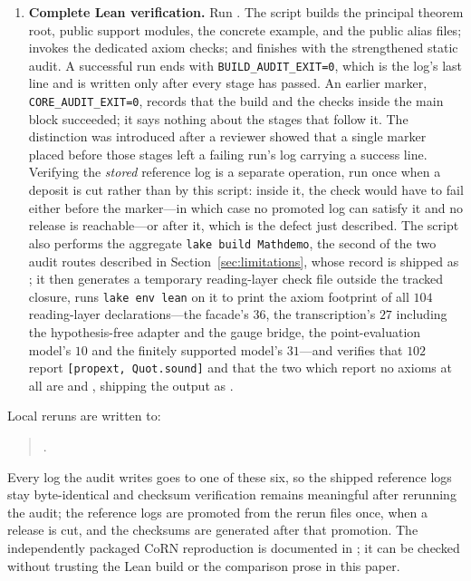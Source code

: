 \documentclass[11pt]{article}
\theoremstyle{definition}
\theoremstyle{remark}
\begin{document}
\begin{enumerate}[label=(\arabic*)]
\item \textbf{Complete Lean verification.}  Run .  The script builds the principal theorem root, public support modules, the concrete example, and the public alias files; invokes the dedicated axiom checks; and finishes with the strengthened static audit.  A successful run ends with \texttt{BUILD\_AUDIT\_EXIT=0}, which is the log's last line and is written only after every stage has passed.  An earlier marker, \texttt{CORE\_AUDIT\_EXIT=0}, records that the build and the checks inside the main block succeeded; it says nothing about the stages that follow it.  The distinction was introduced after a reviewer showed that a single marker placed before those stages left a failing run's log carrying a success line.  Verifying the \emph{stored} reference log is a separate operation, run once when a deposit is cut rather than by this script: inside it, the check would have to fail either before the marker---in which case no promoted log can satisfy it and no release is reachable---or after it, which is the defect just described.  The script also performs the aggregate \texttt{lake build Mathdemo}, the second of the two audit routes described in Section~\ref{sec:limitations}, whose record is shipped as ; it then generates a temporary reading-layer check file outside the tracked closure, runs \texttt{lake env lean} on it to print the axiom footprint of all $104$ reading-layer declarations---the facade's $36$, the transcription's $27$ including the hypothesis-free adapter and the gauge bridge, the point-evaluation model's $10$ and the finitely supported model's $31$---and verifies that $102$ report \texttt{[propext, Quot.sound]} and that the two which report no axioms at all are  and , shipping the output as .
\end{enumerate}

Local reruns are written to:
\begin{quote}\small\raggedright
{}\par {}\par {}\par {}\par {}\par {}. \end{quote} Every log the audit writes goes to one of these six, so the shipped reference logs stay byte-identical and checksum verification remains meaningful after rerunning the audit; the reference logs are promoted from the rerun files once, when a release is cut, and the checksums are generated after that promotion.  The independently packaged CoRN reproduction is documented in ; it can be checked without trusting the Lean build or the comparison prose in this paper.
\end{document}
